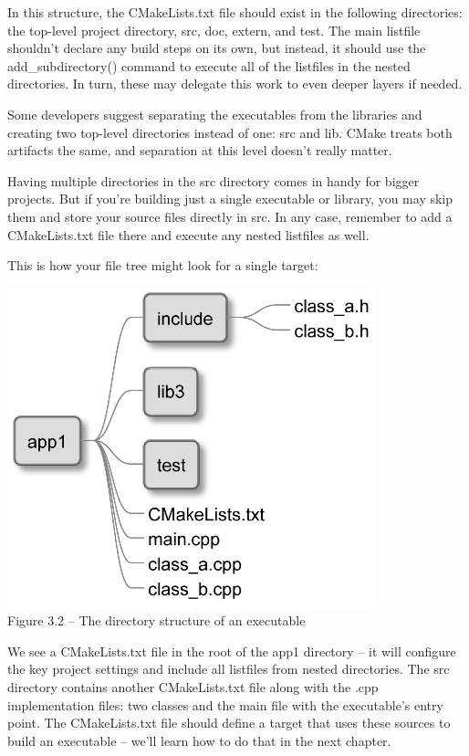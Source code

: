 In this structure, the CMakeLists.txt file should exist in the following directories: the top-level project directory, src, doc, extern, and test. The main listfile shouldn't declare any build steps on its own, but instead, it should use the add\_subdirectory() command to execute all of the listfiles in the nested directories. In turn, these may delegate this work to even deeper layers if needed.

\begin{tcolorbox}[colback=blue!5!white,colframe=blue!75!black,title=Note]
Some developers suggest separating the executables from the libraries and creating two top-level directories instead of one: src and lib. CMake treats both artifacts the same, and separation at this level doesn't really matter.
\end{tcolorbox}

Having multiple directories in the src directory comes in handy for bigger projects. But if you're building just a single executable or library, you may skip them and store your source files directly in src. In any case, remember to add a CMakeLists.txt file there and execute any nested listfiles as well.

This is how your file tree might look for a single target:

\begin{center}
\includegraphics[width=0.8\textwidth]{content/1/chapter3/images/2.jpg}\\
Figure 3.2 – The directory structure of an executable
\end{center}

We see a CMakeLists.txt file in the root of the app1 directory – it will configure the key project settings and include all listfiles from nested directories. The src directory contains another CMakeLists.txt file along with the .cpp implementation files: two classes and the main file with the executable's entry point. The CMakeLists.txt file should define a target that uses these sources to build an executable – we'll learn how to do that in the next chapter.

